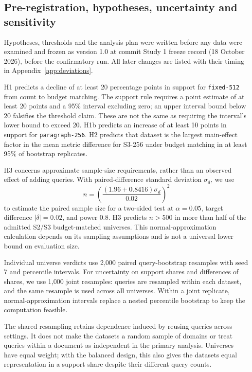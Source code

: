 \documentclass[11pt]{article}
\newcommand{\chunk}[1]{\texttt{#1}}
\begin{document}
\subsection{Pre-registration, hypotheses, uncertainty and sensitivity}
Hypotheses, thresholds and the analysis plan were written before any data were examined and frozen as version 1.0 at
commit Study 1 freeze record (18 October 2026), before the confirmatory run. All later changes are listed with their timing
in Appendix~\ref{app:deviations}.

H1 predicts a decline of at least 20 percentage points in support for \chunk{fixed-512} from count to budget matching.
The support rule requires a point estimate of at least 20 points and a 95\% interval excluding zero; an upper interval
bound below 20 falsifies the threshold claim. These are not the same as requiring the interval's lower bound to exceed
20. H1b predicts an increase of at least 10 points in support for \chunk{paragraph-256}. H2 predicts that dataset is
the largest main-effect factor in the mean metric difference for S3-256 under budget matching in at least 95\% of
bootstrap replicates.

H3 concerns approximate sample-size requirements, rather than an observed effect of adding queries. With
paired-difference standard deviation $\sigma_d$, we use
\begin{equation}
 n=\left(\frac{(1.96+0.8416)\sigma_d}{0.02}\right)^2
 \label{eq:power}
\end{equation}
to estimate the paired sample size for a two-sided test at $\alpha=0.05$, target difference $|\delta|=0.02$, and
power 0.8. H3 predicts $n>500$ in more than half of the admitted S2/S3 budget-matched universes. This
normal-approximation calculation depends on its sampling assumptions and is not a universal lower bound on evaluation
size.

Individual universe verdicts use 2,000 paired query-bootstrap resamples with seed 7 and percentile intervals. For
uncertainty on support shares and differences of shares, we use 1,000 joint resamples: queries are resampled within
each dataset, and the same resample is used across all universes. Within a joint replicate, normal-approximation
intervals replace a nested percentile bootstrap to keep the computation feasible.

The shared resampling retains dependence induced by reusing queries across settings. It does not make the datasets a
random sample of domains or treat queries within a document as independent in the primary analysis. Universes have
equal weight; with the balanced design, this also gives the datasets equal representation in a support share despite
their different query counts.
\end{document}
